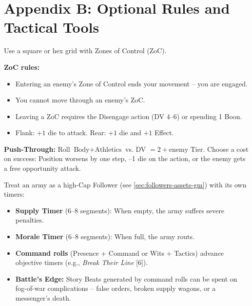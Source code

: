 \clearpage
\section*{Appendix B: Optional Rules and Tactical Tools}
\label{app:optional-rules}

\begin{tcolorbox}[title=Grid-Based Combat (Optional), colback=white!97!gray, colframe=black!80!gray,breakable]
Use a square or hex grid with Zones of Control (ZoC).

\textbf{ZoC rules:}
\begin{itemize}
  \item Entering an enemy's Zone of Control ends your movement -- you are engaged.
  \item You cannot move through an enemy's ZoC.
  \item Leaving a ZoC requires the Disengage action (DV 4--6) or spending 1 Boon.
  \item Flank: \(+1\) die to attack. Rear: \(+1\) die and \(+1\) Effect.
\end{itemize}
\textbf{Push-Through:} Roll \(\text{Body}+\text{Athletics}\) vs. DV \(= 2 + \text{enemy Tier}\). Choose a cost on success: Position worsens by one step, --1 die on the action, or the enemy gets a free opportunity attack.
\end{tcolorbox}

\begin{tcolorbox}[title=Detailed Warfare (Mass Combat), colback=white!97!gray, colframe=black!80!gray,breakable]
Treat an army as a high-Cap Follower (see \ref{sec:followers-assets-gm}) with its own timers:
\begin{itemize}
  \item \textbf{Supply Timer } (6--8 segments): When empty, the army suffers severe penalties.
  \item \textbf{Morale Timer } (6--8 segments): When full, the army routs.
  \item \textbf{Command rolls} (Presence + Command or Wits + Tactics) advance objective timers (e.g., \emph{Break Their Line} [6]).
  \item \textbf{Battle's Edge:} Story Beats generated by command rolls can be spent on fog-of-war complications -- false orders, broken supply wagons, or a messenger's death.
\end{itemize}
\end{tcolorbox}

